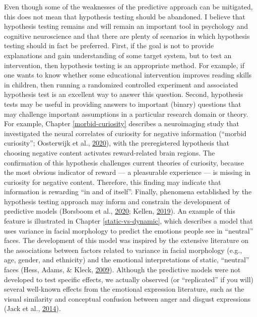 \documentclass[11pt,american,a4paper,oneside,]{memoir} %
\begin{document}
Even though some of the weaknesses of the predictive approach can be mitigated, this does not mean that hypothesis testing should be abandoned. I believe that hypothesis testing remains and will remain an important tool in psychology and cognitive neuroscience and that there are plenty of scenarios in which hypothesis testing should in fact be preferred. First, if the goal is not to provide explanations and gain understanding of some target system, but to test an intervention, then hypothesis testing is an appropriate method. For example, if one wants to know whether some educational intervention improves reading skills in children, then running a randomized controlled experiment and associated hypothesis test is an excellent way to answer this question. Second, hypothesis tests may be useful in providing answers to important (binary) questions that may challenge important assumptions in a particular research domain or theory. For example, Chapter \ref{morbid-curiosity} describes a neuroimaging study that investigated the neural correlates of curiosity for negative information (``morbid curiosity''; Oosterwijk et al., \protect\hyperlink{ref-Oosterwijk2020-uf}{2020}), with the preregistered hypothesis that choosing negative content activates reward-related brain regions. The confirmation of this hypothesis challenges current theories of curiosity, because the most obvious indicator of reward --- a pleasurable experience --- is missing in curiosity for negative content. Therefore, this finding may indicate that information is rewarding ``in and of itself''. Finally, phenomena established by the hypothesis testing approach may inform and constrain the development of predictive models (Borsboom et al., \protect\hyperlink{ref-Borsboom2020-xg}{2020}; Kellen, \protect\hyperlink{ref-Kellen2019-af}{2019}). An example of this feature is illustrated in Chapter \ref{static-vs-dynamic}, which describes a model that uses variance in facial morphology to predict the emotions people see in ``neutral'' faces. The development of this model was inspired by the extensive literature on the associations between factors related to variance in facial morphology (e.g., age, gender, and ethnicity) and the emotional interpretations of static, ``neutral'' faces (Hess, Adams, \& Kleck, \protect\hyperlink{ref-Hess2009-xo}{2009}). Although the predictive models were not developed to test specific effects, we actually observed (or ``replicated'' if you will) several well-known effects from the emotional expression literature, such as the visual similarity and conceptual confusion between anger and disgust expressions (Jack et al., \protect\hyperlink{ref-Jack2014-ku}{2014}).
\end{document}
